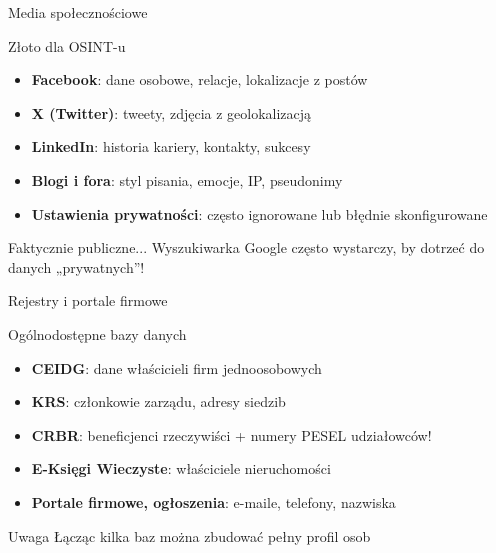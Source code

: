 \begin{frame}{Media społecznościowe}
\begin{block}{Złoto dla OSINT-u}
\begin{itemize}
  \item \textbf{Facebook}: dane osobowe, relacje, lokalizacje z postów
  \item \textbf{X (Twitter)}: tweety, zdjęcia z geolokalizacją
  \item \textbf{LinkedIn}: historia kariery, kontakty, sukcesy
  \item \textbf{Blogi i fora}: styl pisania, emocje, IP, pseudonimy
  \item \textbf{Ustawienia prywatności}: często ignorowane lub błędnie skonfigurowane
\end{itemize}
\end{block}
\pause
\begin{exampleblock}{Faktycznie publiczne...}
Wyszukiwarka Google często wystarczy, by dotrzeć do danych „prywatnych”!
\end{exampleblock}
\end{frame}

\begin{frame}{Rejestry i portale firmowe}
\begin{block}{Ogólnodostępne bazy danych}
\begin{itemize}
  \item \textbf{CEIDG}: dane właścicieli firm jednoosobowych
  \item \textbf{KRS}: członkowie zarządu, adresy siedzib
  \item \textbf{CRBR}: beneficjenci rzeczywiści + numery PESEL udziałowców!
  \item \textbf{E-Księgi Wieczyste}: właściciele nieruchomości
  \item \textbf{Portale firmowe, ogłoszenia}: e-maile, telefony, nazwiska
\end{itemize}
\end{block}
\pause
\begin{alertblock}{Uwaga}
Łącząc kilka baz można zbudować pełny profil osob
\end{alertblock}
\end{frame}

